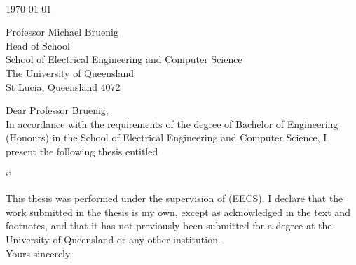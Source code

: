 \begin{flushright}
    \authortext\\
    \href{mailto:\authoremailtext}{\authoremailtext}
\end{flushright}

\vspace{2cm}
\noindent
\today \\\bigskip

\noindent
Professor Michael Bruenig\\
Head of School\\
School of Electrical Engineering and Computer Science\\
The University of Queensland\\
St Lucia, Queensland 4072\\\bigskip

\noindent
Dear Professor Bruenig,\\

In accordance with the requirements of the degree of Bachelor of Engineering (Honours) in the School of Electrical Engineering and Computer Science, I present the following thesis entitled

\begin{center}
`\titletext'
\end{center}

This thesis was performed under the supervision of \supervisornametext (EECS). I declare that the work submitted in the thesis is my own, except as acknowledged in the text and footnotes, and that it has not previously been submitted for a degree at the University of Queensland or any other institution.\\

\noindent
Yours sincerely,\\\\%

\noindent
\authortext

\clearpage